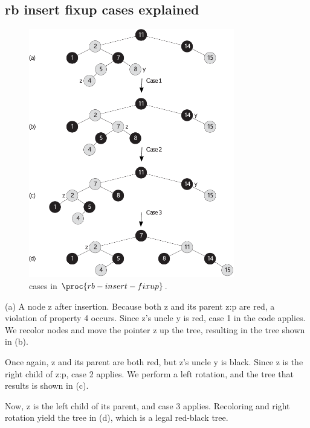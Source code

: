 \documentclass[UTF8,11pt,openany]{ctexbook}
\begin{document}
\subsection{rb insert fixup cases explained}
\begin{figure}[h] %
	\centering %
	\includegraphics[width=0.8\textwidth]{vector/red-black-tree/insert/rb_insert_fix_cases.pdf} %
	\caption{ cases in $ \proc{rb-insert-fixup}  $.  } %
	\label{rb_insert_fix_cases} %
\end{figure}%
\noindent(a) A node z after insertion. Because both z
and its parent z:p are red, a violation of property 4 occurs. Since z’s uncle y is red, case 1 in the
code applies. We recolor nodes and move the pointer z up the tree, resulting in the tree shown in (b).

\noindent Once again, z and its parent are both red, but z’s uncle y is black. Since z is the right child of z:p,
case 2 applies. We perform a left rotation, and the tree that results is shown in (c).

\noindent Now, z is the left
child of its parent, and case 3 applies. Recoloring and right rotation yield the tree in (d), which is a
legal red-black tree.
\end{document}
